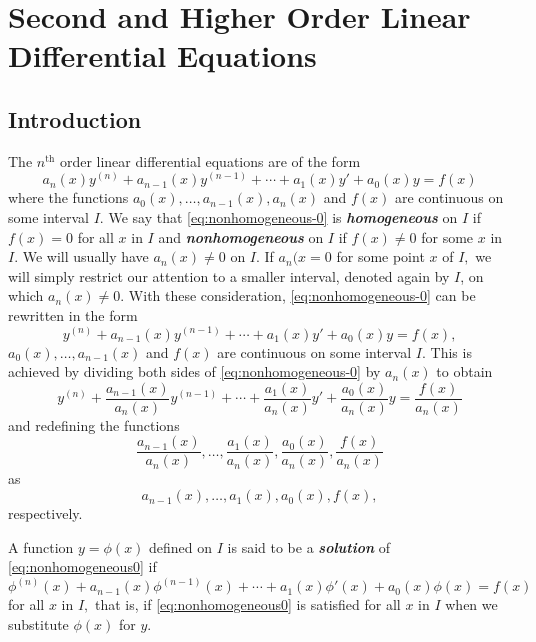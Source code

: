 \setcounter{chapter}{2}


\chapter{Second and Higher Order Linear Differential Equations}\label{chap:higher-order}

\minitoc
\section{Introduction}
The $n^\text{th}$ order linear differential equations are of the form
\begin{equation}\label{eq:nonhomogeneous-0}
	a_n(x)y^{(n)} + a_{n-1}(x)y^{(n-1)} + \cdots + a_1(x)y' + a_0(x)y = f(x)
\end{equation}
where   the  functions \( a_0(x), \dots, a_{n-1}(x), a_n(x) \) and   \( f(x) \) are continuous on some interval \( I .\)
We say that \eqref{eq:nonhomogeneous-0} is \textbf{\textit{homogeneous}} on $I$ if $f(x) = 0$ for all $x$ in $I$ and \textbf{\textit{nonhomogeneous}} on $I$ if $f(x)\ne 0$ for some $x$ in $I.$  We will usually have $a_n(x) \ne 0$ on $I.$ If $a_n(x=0$ for some point $x$ of $I,$ we will simply restrict our attention to a smaller interval, denoted again by \(I\), on which $a_n(x) \ne 0.$  With these consideration, \eqref{eq:nonhomogeneous-0} can be   rewritten in the form
\begin{equation}\label{eq:nonhomogeneous0}
	y^{(n)} + a_{n-1}(x)y^{(n-1)} + \cdots + a_1(x)y' + a_0(x)y = f(x),
\end{equation}
 \( a_0(x), \dots, a_{n-1}(x) \) and   \( f(x) \) are continuous on some interval \( I .\) This is achieved by dividing both sides of \eqref{eq:nonhomogeneous-0} by $a_n(x)$ to obtain
 \[y^{(n)}+\frac{a_{n-1}(x)}{a_n(x)}y^{(n-1)}+ \cdots+\frac{a_1(x)}{a_n(x)}y'+\frac{a_0(x)}{a_n(x)}y= \frac{f(x)}{a_n(x)} \]
  and redefining the   functions \[ \frac{a_{n-1}(x)}{a_n(x)}, \dots,\frac{a_1(x)}{a_n(x)}, \frac{a_0(x)}{a_n(x)}, \frac{f(x)}{a_n(x)} \] as \[ a_{n-1}(x), \dots,a_1(x), a_0(x), f(x), \] respectively. 
 
\begin{definition}[Solution]\label{def:solutions}
	A function $y = \phi(x)$ defined on $I$ is said to be a \textbf{\textit{solution}} of \eqref{eq:nonhomogeneous0} if 
	\[\phi^{(n)}(x) + a_{n-1}(x)\phi^{(n-1)}(x) + \cdots + a_1(x)\phi'(x) + a_0(x)\phi(x) = f(x)\] for all $x$ in $I,$ that is, if
	\eqref{eq:nonhomogeneous0} is satisfied for all $x$ in $I$ when we substitute $\phi(x)$  for $y.$
\end{definition}

